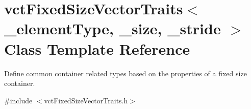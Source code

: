 \hypertarget{classvct_fixed_size_vector_traits}{\section{vct\-Fixed\-Size\-Vector\-Traits$<$ \-\_\-element\-Type, \-\_\-size, \-\_\-stride $>$ Class Template Reference}
\label{classvct_fixed_size_vector_traits}
}


Define common container related types based on the properties of a fixed size container.  




{\ttfamily \#include $<$vct\-Fixed\-Size\-Vector\-Traits.\-h$>$}

